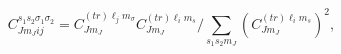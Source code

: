 \begin{equation}
C_{Jm_{J}ij}^{s_{1}s_{2}\sigma _{1}\sigma _{2}}=C_{Jm_{J}}^{\left( tr\right)
\ell _{j}m_{\sigma }}C_{Jm_{J}}^{\left( tr\right) \ell
_{i}m_{s}}/\sum_{s_{1}s_{2}m_{J}}\left( C_{Jm_{J}}^{\left( tr\right) \ell
_{i}m_{s}}\right) ^{2},
\end{equation}

